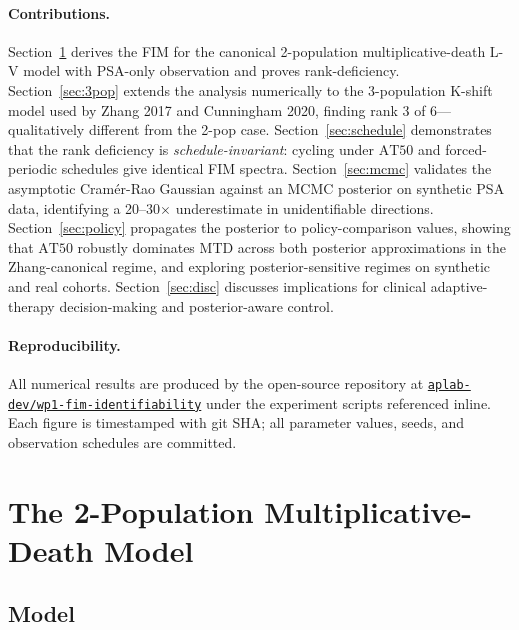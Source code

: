 \documentclass[11pt]{article}
\newcommand{\AT}{\mathrm{AT}}
\begin{document}
\paragraph{Contributions.} Section~\ref{sec:2pop} derives the FIM for the canonical
2-population multiplicative-death L-V model with PSA-only observation and proves
rank-deficiency. Section~\ref{sec:3pop} extends the analysis numerically to the
3-population K-shift model used by Zhang 2017 and Cunningham 2020, finding rank
3 of 6---qualitatively different from the 2-pop case. Section~\ref{sec:schedule}
demonstrates that the rank deficiency is \emph{schedule-invariant}: cycling
under $\AT 50$ and forced-periodic schedules give identical FIM spectra.
Section~\ref{sec:mcmc} validates the asymptotic Cram\'er-Rao Gaussian against an
MCMC posterior on synthetic PSA data, identifying a 20--30$\times$ underestimate
in unidentifiable directions. Section~\ref{sec:policy} propagates the posterior
to policy-comparison values, showing that $\AT 50$ robustly dominates MTD across
both posterior approximations in the Zhang-canonical regime, and exploring
posterior-sensitive regimes on synthetic and real cohorts. Section~\ref{sec:disc}
discusses implications for clinical adaptive-therapy decision-making and
posterior-aware control.

\paragraph{Reproducibility.} All numerical results are produced by the
open-source repository at \href{https://github.com/aplab-dev/wp1-fim-identifiability}{\texttt{aplab-dev/wp1-fim-identifiability}}
under the experiment scripts referenced inline. Each figure is timestamped with
git SHA; all parameter values, seeds, and observation schedules are committed.

\section{The 2-Population Multiplicative-Death Model}\label{sec:2pop}

\subsection{Model}
\end{document}
